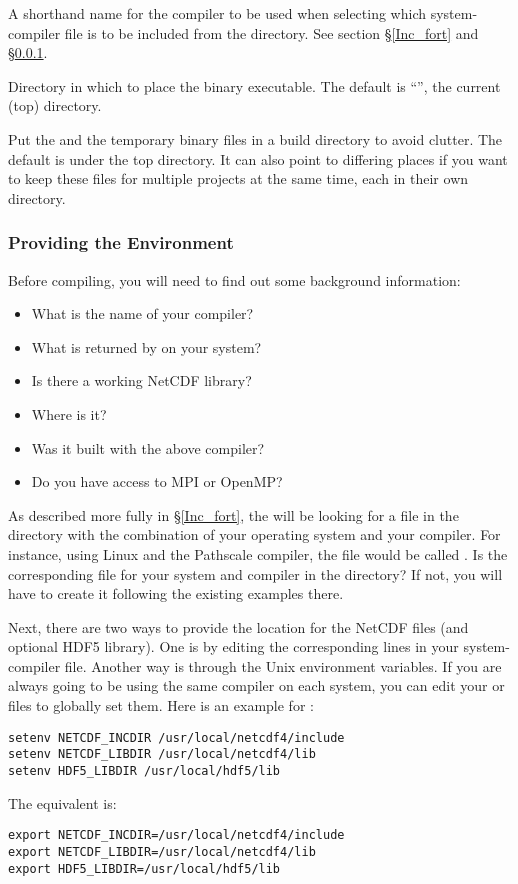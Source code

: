 \begin{klist}
 A shorthand name for the compiler to be used when
selecting which system-compiler file is to be included from the
 directory. See section \S\ref{Inc_fort} and
\S\ref{make_env}.

\begin{klist}
   Directory in which to place the binary executable.
The default is ``'', the current (top) directory.

   Put the  and the temporary binary files
in a build directory to avoid clutter. The default is 
under the top directory. It can also point to differing places if you want
to keep these files for multiple projects at the same time, each in
their own directory.
\end{klist}
\end{klist}

\subsubsection{Providing the Environment}
\label{make_env}

Before compiling, you will need to find out some background information:
\begin{itemize}
 \item What is the name of your compiler?
 \item What is returned by  on your system?
 \item Is there a working NetCDF library?
 \item Where is it?
 \item Was it built with the above compiler?
 \item Do you have access to MPI or OpenMP?
\end{itemize}
As described more fully in \S\ref{Inc_fort}, the  will be
looking for a file in the  directory with the
combination of your operating system and your compiler. For
instance, using Linux and the Pathscale compiler, the file would be
called . Is the corresponding file for your
system and compiler in the  directory? If not, you
will have to create it following the existing examples there.

Next, there are two ways to provide the location for the NetCDF
files (and optional HDF5 library). One is by editing the corresponding
lines in your system-compiler file. Another way is through the
Unix environment variables. If you are always going to be using
the same compiler on each system, you can edit your 
or  files to globally set them. Here is an example for
:
\begin{verbatim}
setenv NETCDF_INCDIR /usr/local/netcdf4/include
setenv NETCDF_LIBDIR /usr/local/netcdf4/lib
setenv HDF5_LIBDIR /usr/local/hdf5/lib
\end{verbatim}
The  equivalent is:
\begin{verbatim}
export NETCDF_INCDIR=/usr/local/netcdf4/include
export NETCDF_LIBDIR=/usr/local/netcdf4/lib
export HDF5_LIBDIR=/usr/local/hdf5/lib
\end{verbatim}

